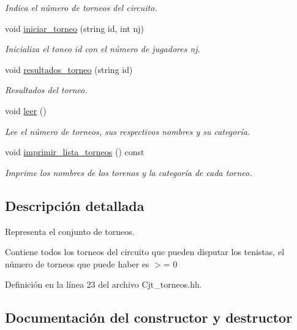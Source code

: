 \begin{DoxyCompactItemize}
\begin{DoxyCompactList}\small\item\em Indica el número de torneos del circuito. \end{DoxyCompactList}\item 
void \hyperlink{class_cjt__torneos_a6b77c538bd9a25a0ec6563849736e6d6}{iniciar\+\_\+torneo} (string id, int nj)
\begin{DoxyCompactList}\small\item\em Inicializa el toneo id con el número de jugadores nj. \end{DoxyCompactList}\item 
void \hyperlink{class_cjt__torneos_aa61972563342ca00b87a3c9b0ea78b6c}{resultados\+\_\+torneo} (string id)
\begin{DoxyCompactList}\small\item\em Resultados del torneo. \end{DoxyCompactList}\item 
void \hyperlink{class_cjt__torneos_af0f18e3971687674b58d020689fa2203}{leer} ()
\begin{DoxyCompactList}\small\item\em Lee el número de torneos, sus respectivos nombres y su categoría. \end{DoxyCompactList}\item 
void \hyperlink{class_cjt__torneos_aeaa059c6509b254de82f218f09ff9e3e}{imprimir\+\_\+lista\+\_\+torneos} () const
\begin{DoxyCompactList}\small\item\em Imprime los nombres de los torenos y la categoría de cada torneo. \end{DoxyCompactList}\end{DoxyCompactItemize}


\subsection{Descripción detallada}
Representa el conjunto de torneos. 

Contiene todos los torneos del circuito que pueden disputar los tenistas, el número de torneos que puede haber es $>$= 0 

Definición en la línea 23 del archivo Cjt\+\_\+torneos.\+hh.



\subsection{Documentación del constructor y destructor}
\mbox{\label{class_cjt__torneos_acc82582b779afd52bbb92c8094d473ac}} 
